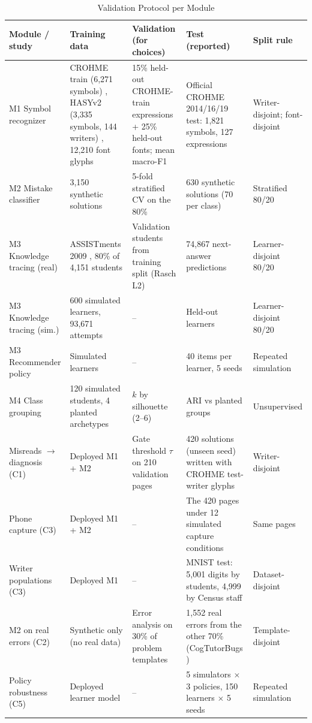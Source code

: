 \documentclass[conference]{IEEEtran}
\begin{document}
\begin{table}[!t]
\caption{Validation Protocol per Module}
\label{tab:protocol}
\centering
\footnotesize
\begin{tabular}{L{2.6cm}L{4.0cm}L{3.5cm}L{3.6cm}L{2.2cm}}
\toprule
Module / study & Training data & Validation (for choices) & Test (reported) & Split rule\\
\midrule
M1 Symbol recognizer & CROHME train (6,271 symbols) \cite{crohme}, HASYv2 (3,335 symbols, 144 writers) \cite{hasy}, 12,210 font glyphs & 15\% held-out CROHME-train expressions + 25\% held-out fonts; mean macro-F1 & Official CROHME 2014/16/19 test: 1,821 symbols, 127 expressions & Writer-disjoint; font-disjoint\\
M2 Mistake classifier & 3,150 synthetic solutions & 5-fold stratified CV on the 80\% & 630 synthetic solutions (70 per class) & Stratified 80/20\\
M3 Knowledge tracing (real) & ASSISTments 2009 \cite{assist}, 80\% of 4,151 students & Validation students from training split (Rasch L2) & 74,867 next-answer predictions & Learner-disjoint 80/20\\
M3 Knowledge tracing (sim.) & 600 simulated learners, 93,671 attempts & -- & Held-out learners & Learner-disjoint 80/20\\
M3 Recommender policy & Simulated learners & -- & 40 items per learner, 5 seeds & Repeated simulation\\
M4 Class grouping & 120 simulated students, 4 planted archetypes & $k$ by silhouette (2--6) & ARI vs planted groups & Unsupervised\\
\midrule
Misreads $\rightarrow$ diagnosis (C1) & Deployed M1 + M2 & Gate threshold $\tau$ on 210 validation pages & 420 solutions (unseen seed) written with CROHME test-writer glyphs & Writer-disjoint\\
Phone capture (C3) & Deployed M1 + M2 & -- & The 420 pages under 12 simulated capture conditions & Same pages\\
Writer populations (C3) & Deployed M1 & -- & MNIST test: 5,001 digits by students, 4,999 by Census staff \cite{mnist,qmnist} & Dataset-disjoint\\
M2 on real errors (C2) & Synthetic only (no real data) & Error analysis on 30\% of problem templates & 1,552 real errors from the other 70\% (CogTutorBugs \cite{cogtutorbugs}) & Template-disjoint\\
Policy robustness (C5) & Deployed learner model & -- & 5 simulators $\times$ 3 policies, 150 learners $\times$ 5 seeds & Repeated simulation\\
\bottomrule
\end{tabular}
\end{table}
\end{document}
